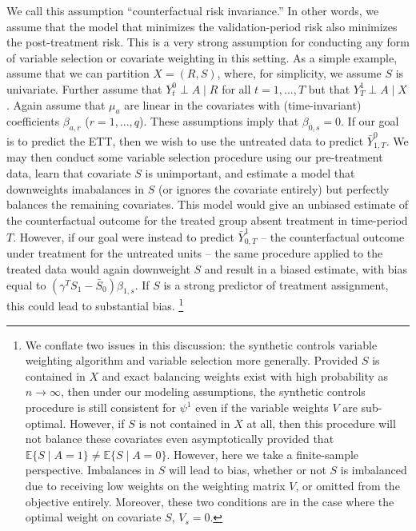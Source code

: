 We call this assumption ``counterfactual risk invariance.'' In other words, we assume that the model that minimizes the validation-period risk also minimizes the post-treatment risk. This is a very strong assumption for conducting any form of variable selection or covariate weighting in this setting. As a simple example, assume that we can partition $X = (R, S)$, where, for simplicity, we assume $S$ is univariate. Further assume that $Y^0_t \perp A \mid R$ for all $t = 1, ..., T$ but that $Y^1_T \perp A \mid X$. Again assume that $\mu_a$ are linear in the covariates with (time-invariant) coefficients $\beta_{a, r}$ ($r = 1, ..., q$). These assumptions imply that $\beta_{0, s} = 0$. If our goal is to predict the ETT, then we wish to use the untreated data to predict $\bar{Y}_{1, T}^0$. We may then conduct some variable selection procedure using our pre-treatment data, learn that covariate $S$ is unimportant, and estimate a model that downweights imabalances in $S$ (or ignores the covariate entirely) but perfectly balances the remaining covariates. This model would give an unbiased estimate of the counterfactual outcome for the treated group absent treatment in time-period $T$. However, if our goal were instead to predict $\bar{Y}^1_{0, T}$ -- the counterfactual outcome under treatment for the untreated units -- the same procedure applied to the treated data would again downweight $S$ and result in a biased estimate, with bias equal to $(\gamma^TS_1 - \bar{S}_0) \beta_{1, s}$. If $S$ is a strong predictor of treatment assignment, this could lead to substantial bias. \footnote{We conflate two issues in this discussion: the synthetic controls variable weighting algorithm and variable selection more generally. Provided $S$ is contained in $X$ and exact balancing weights exist with high probability as $n \to \infty$, then under our modeling assumptions, the synthetic controls procedure is still consistent for $\psi^1$ even if the variable weights $V$ are sub-optimal. However, if $S$ is not contained in $X$ at all, then this procedure will not balance these covariates even asymptotically provided that $\mathbb{E}\{S \mid A = 1\} \ne \mathbb{E}\{S \mid A = 0\}$. However, here we take a finite-sample perspective. Imbalances in $S$ will lead to bias, whether or not $S$ is imbalanced due to receiving low weights on the weighting matrix $V$, or omitted from the objective entirely. Moreover, these two conditions are in the case where the optimal weight on covariate $S$, $V_s = 0$.} 

